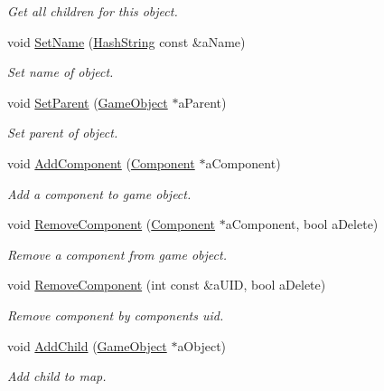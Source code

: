 \begin{DoxyCompactItemize}
\begin{DoxyCompactList}\small\item\em Get all children for this object. \end{DoxyCompactList}\item 
void \hyperlink{classGameObject_ad3d1d7edd9c119e39e3f49fd0b55c4d9}{Set\+Name} (\hyperlink{classHashString}{Hash\+String} const \&a\+Name)
\begin{DoxyCompactList}\small\item\em Set name of object. \end{DoxyCompactList}\item 
void \hyperlink{classGameObject_aa9d3c233287adbb5d766d6c5c605793a}{Set\+Parent} (\hyperlink{classGameObject}{Game\+Object} $\ast$a\+Parent)
\begin{DoxyCompactList}\small\item\em Set parent of object. \end{DoxyCompactList}\item 
void \hyperlink{classGameObject_a581f2ea9d145bd53fd6dac12453cc783}{Add\+Component} (\hyperlink{classComponent}{Component} $\ast$a\+Component)
\begin{DoxyCompactList}\small\item\em Add a component to game object. \end{DoxyCompactList}\item 
void \hyperlink{classGameObject_acd66284c95aee6e5f214a9a7761056d2}{Remove\+Component} (\hyperlink{classComponent}{Component} $\ast$a\+Component, bool a\+Delete)
\begin{DoxyCompactList}\small\item\em Remove a component from game object. \end{DoxyCompactList}\item 
void \hyperlink{classGameObject_adf3106a05ce632f85bd7f40f7f8d9f52}{Remove\+Component} (int const \&a\+U\+ID, bool a\+Delete)
\begin{DoxyCompactList}\small\item\em Remove component by component\textquotesingle{}s uid. \end{DoxyCompactList}\item 
void \hyperlink{classGameObject_af7fa13dc482e575a9c04066adfc0cd43}{Add\+Child} (\hyperlink{classGameObject}{Game\+Object} $\ast$a\+Object)
\begin{DoxyCompactList}\small\item\em Add child to map. \end{DoxyCompactList}\item 

\end{DoxyCompactItemize}
